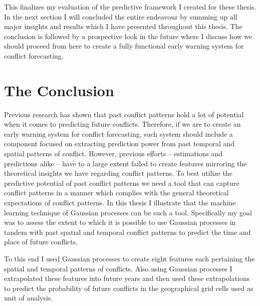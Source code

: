 \documentclass[a4paper]{article}
\begin{document}
This finalizes my evaluation of the predictive framework I created for these thesis. In the next section I will concluded the entire endeavour by summing up all major insights and results which I have presented throughout this thesis. The conclusion is followed by a prospective look in the future where I discuss how we should proceed from here to create a fully functional early warning system for conflict forecasting.\par

\section{The Conclusion}

Previous research has shown that past conflict patterns hold a lot of potential when it comes to predicting future conflicts. Therefore, if we are to create an early warning system for conflict forecasting, such system should include a component focused on extracting prediction power from past temporal and spatial patterns of conflict. However, previous efforts -- estimations and predictions alike -- have to a large extent failed to create features mirroring the theoretical insights we have regarding conflict patterns. To best utilize the predictive potential of past conflict patterns we need a tool that can capture conflict patterns in a manner which complies with the general theoretical expectations of conflict patterns. In this thesis I illustrate that the machine learning technique of Gaussian processes can be such a tool. Specifically my goal was to assess the extent to which it is possible to use Gaussian processes in tandem with past spatial and temporal conflict patterns to predict the time and place of future conflicts.\par




To this end I used Gaussian processes to create eight features each pertaining the spatial and temporal patterns of conflicts. Also using Gaussian processes I extrapolated these features into future years and then used these extrapolations to predict the probability of future conflicts in the geographical grid cells used as unit of analysis.\par
\end{document}
